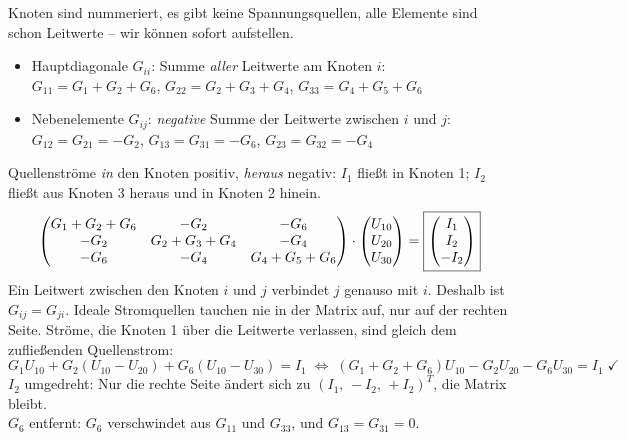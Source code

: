 \documentclass[11pt,a4paper]{article}
\begin{document}
\begin{loesung}
Knoten sind nummeriert, es gibt keine Spannungsquellen, alle Elemente sind schon Leitwerte -- wir können sofort aufstellen.
\begin{itemize}[nosep]
  \item Hauptdiagonale $G_{ii}$: Summe \emph{aller} Leitwerte am Knoten $i$:\\
        $G_{11} = G_1+G_2+G_6$, \quad $G_{22} = G_2+G_3+G_4$, \quad $G_{33} = G_4+G_5+G_6$
  \item Nebenelemente $G_{ij}$: \emph{negative} Summe der Leitwerte zwischen $i$ und $j$:\\
        $G_{12} = G_{21} = -G_2$, \quad $G_{13} = G_{31} = -G_6$, \quad $G_{23} = G_{32} = -G_4$
\end{itemize}
Quellenströme \emph{in} den Knoten positiv, \emph{heraus} negativ: $I_1$ fließt in Knoten 1; $I_2$ fließt aus Knoten 3 heraus und in Knoten 2 hinein.
\[
  \begin{pmatrix}
    G_1+G_2+G_6 & -G_2 & -G_6\\
    -G_2 & G_2+G_3+G_4 & -G_4\\
    -G_6 & -G_4 & G_4+G_5+G_6
  \end{pmatrix}
  \cdot
  \begin{pmatrix} U_{10}\\ U_{20}\\ U_{30}\end{pmatrix}
  = \boxed{\begin{pmatrix} I_1\\ I_2\\ -I_2\end{pmatrix}}
\]
Ein Leitwert zwischen den Knoten $i$ und $j$ verbindet $j$ genauso mit $i$. Deshalb ist $G_{ij} = G_{ji}$. Ideale Stromquellen tauchen nie in der Matrix auf, nur auf der rechten Seite.
Ströme, die Knoten 1 über die Leitwerte verlassen, sind gleich dem zufließenden Quellenstrom:
\[
  G_1U_{10} + G_2(U_{10}-U_{20}) + G_6(U_{10}-U_{30}) = I_1
  \;\Leftrightarrow\; (G_1+G_2+G_6)U_{10} - G_2U_{20} - G_6U_{30} = I_1 \;\checkmark
\]
$I_2$ umgedreht: Nur die rechte Seite ändert sich zu $(I_1,\,-I_2,\,+I_2)^T$, die Matrix bleibt.\\
$G_6$ entfernt: $G_6$ verschwindet aus $G_{11}$ und $G_{33}$, und $G_{13} = G_{31} = 0$.
\end{loesung}
\end{document}

